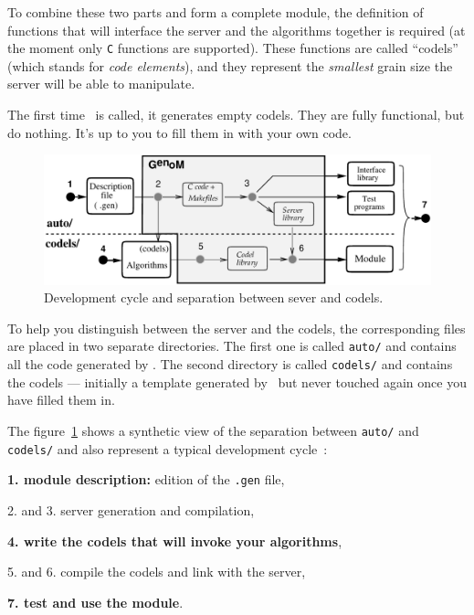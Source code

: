 To combine these two parts and form  a complete module, the definition of
functions that  will interface the server and  the algorithms together is
required (at the moment  only {\tt  C}  functions are  supported).  These
functions are  called ``codels'' (which  stands for {\em code elements}),
and they represent the {\em smallest} grain size  the server will be able
to manipulate.

The first  time \GenoM\  is called,  it generates empty  codels. They are
fully  functional, but do  nothing. It's up to  you to fill  them in with
your own code.

\bigbreak

\begin{figure}[htbp]
\centering
\includegraphics[width=0.8\hsize]{fig/cycle-en}
\caption{Development cycle and separation between sever and codels.}
\label{fig|session|cycle}
\end{figure}

To help   you distinguish  between   the  server   and the   codels,  the
corresponding files are placed in two separate directories. The first one
is called {\tt auto/} and contains all  the code generated by \GenoM. The
second directory is called {\tt   codels/} and  contains the codels   ---
initially a template generated by \GenoM\ but never touched again once
you have filled them in.

\bigbreak

The figure~\ref{fig|session|cycle} shows a synthetic view of the
separation between {\tt auto/} and {\tt codels/} and also represent a
typical development cycle~:

\begin{description}
   \item{\bf 1. module description:} edition of the {\tt .gen} file,
   \item{2. and 3. server generation and compilation},
   \item{\bf 4. write the codels that will invoke your algorithms},
   \item{5. and 6. compile the codels and link with the server},
   \item{\bf 7. test and use the module}.
\end{description}

